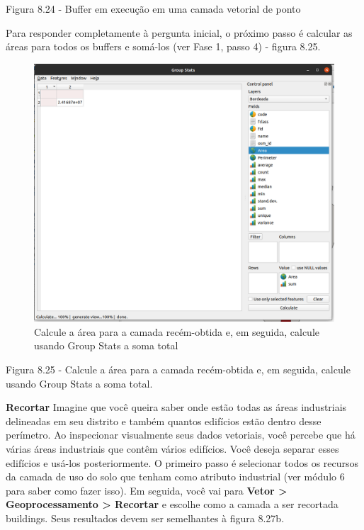 \documentclass[
  portuguese,
]{krantz}
\begin{document}
Figura 8.24 - Buffer em execução em uma camada vetorial de ponto

Para responder completamente à pergunta inicial, o próximo passo é calcular as áreas para todos os buffers e somá-los (ver Fase 1, passo 4) - figura 8.25.

\begin{figure}
\centering
\includegraphics{media/modulo8/fig825.png}
\caption{Calcule a área para a camada recém-obtida e, em seguida, calcule usando Group Stats a soma total}
\end{figure}

Figura 8.25 - Calcule a área para a camada recém-obtida e, em seguida, calcule usando Group Stats a soma total.

\textbf{Recortar} Imagine que você queira saber onde estão todas as áreas industriais delineadas em seu distrito e também quantos edifícios estão dentro desse perímetro. Ao inspecionar visualmente seus dados vetoriais, você percebe que há várias áreas industriais que contêm vários edifícios. Você deseja separar esses edifícios e usá-los posteriormente. O primeiro passo é selecionar todos os recursos da camada de uso do solo que tenham como atributo industrial (ver módulo 6 para saber como fazer isso). Em seguida, você vai para \textbf{Vetor \textgreater{} Geoprocessamento \textgreater{} Recortar} e escolhe como a camada a ser recortada buildings. Seus resultados devem ser semelhantes à figura 8.27b.
\end{document}
